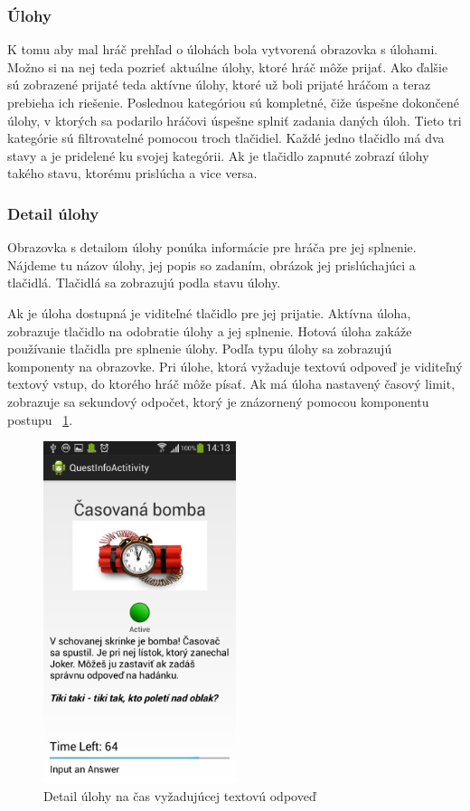 \subsubsection{Úlohy}
K tomu aby mal hráč prehľad o úlohách bola vytvorená obrazovka s úlohami. Možno si na nej teda pozrieť aktuálne úlohy, ktoré hráč môže prijať. Ako ďalšie sú zobrazené prijaté teda aktívne úlohy, ktoré už boli prijaté hráčom a teraz prebieha ich riešenie. Poslednou kategóriou sú kompletné, čiže úspešne dokončené úlohy, v ktorých sa podarilo hráčovi úspešne splniť zadania daných úloh. Tieto tri kategórie sú filtrovatelné pomocou troch tlačidiel. Každé jedno tlačidlo má dva stavy a je pridelené ku svojej kategórii. Ak je tlačidlo zapnuté zobrazí úlohy takého stavu, ktorému prislúcha a vice versa.

\subsubsection{Detail úlohy}
Obrazovka s detailom úlohy ponúka informácie pre hráča pre jej splnenie. Nájdeme tu názov úlohy, jej popis so zadaním, obrázok jej prislúchajúci a tlačidlá. Tlačidlá sa zobrazujú podla stavu úlohy. 

Ak je úloha dostupná je viditeľné tlačidlo pre jej prijatie. 
Aktívna úloha, zobrazuje tlačidlo na odobratie úlohy a jej splnenie. Hotová úloha zakáže používanie tlačidla pre splnenie úlohy. Podľa typu úlohy sa zobrazujú komponenty na obrazovke. Pri úlohe, ktorá vyžaduje textovú odpoveď je viditeľný textový vstup, do ktorého hráč môže písať. Ak má úloha nastavený časový limit, zobrazuje sa sekundový odpočet, ktorý je znázornený pomocou komponentu postupu ~\ref{fig:klient_deatilUlohy}.
\begin{figure}[h]
  \centering
  \includegraphics[height=10cm]{mainmatter/imgs/klient_questrunning.png}
  \caption{Detail úlohy na čas vyžadujúcej textovú odpoveď}
  \label{fig:klient_deatilUlohy}
\end{figure}


